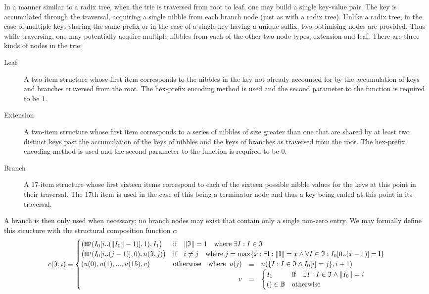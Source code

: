 \documentclass[9pt,oneside]{amsart}
\begin{document}
In a manner similar to a radix tree, when the trie is traversed from root to leaf, one may build a single key-value pair. The key is accumulated through the traversal, acquiring a single nibble from each branch node (just as with a radix tree). Unlike a radix tree, in the case of multiple keys sharing the same prefix or in the case of a single key having a unique suffix, two optimising nodes are provided. Thus while traversing, one may potentially acquire multiple nibbles from each of the other two node types, extension and leaf. There are three kinds of nodes in the trie:
\begin{description}
\item[Leaf] A two-item structure whose first item corresponds to the nibbles in the key not already accounted for by the accumulation of keys and branches traversed from the root. The hex-prefix encoding method is used and the second parameter to the function is required to be 1.
\item[Extension] A two-item structure whose first item corresponds to a series of nibbles of size greater than one that are shared by at least two distinct keys past the accumulation of the keys of nibbles and the keys of branches as traversed from the root. The hex-prefix encoding method is used and the second parameter to the function is required to be 0.
\item[Branch] A 17-item structure whose first sixteen items correspond to each of the sixteen possible nibble values for the keys at this point in their traversal. The 17th item is used in the case of this being a terminator node and thus a key being ended at this point in its traversal.
\end{description}

A branch is then only used when necessary; no branch nodes may exist that contain only a single non-zero entry. We may formally define this structure with the structural composition function $c$:
\begin{equation}
c(\mathfrak{I}, i) \equiv \begin{cases}
 \big(\texttt{HP}(I_0[i .. (\lVert I_0\rVert - 1)], 1), I_1 \big) & \text{if} \quad \lVert \mathfrak{I} \rVert = 1 \quad \text{where} \; \exists I: I \in \mathfrak{I} \\
\big(\texttt{HP}(I_0[i .. (j - 1)], 0), n(\mathfrak{I}, j) \big) & \text{if} \quad i \ne j \quad \text{where} \; j = \max \{ x : \exists \mathbf{l}: \lVert \mathbf{l} \rVert = x \wedge \forall I \in \mathfrak{I}: I_0[0 .. (x - 1)] = \mathbf{l} \} \\
(u(0), u(1), ..., u(15), v) & \text{otherwise} \quad \text{where} \begin{array}[t]{rcl}
u(j) & \equiv & n(\{ I : I \in \mathfrak{I} \wedge I_0[i] = j \}, i + 1) \\
v & = & \begin{cases}
I_1 & \text{if} \quad \exists I: I \in \mathfrak{I} \wedge \lVert I_0 \rVert = i \\
() \in \mathbb{B} & \text{otherwise}
\end{cases}
\end{array}
\end{cases}
\end{equation}
\end{document}
